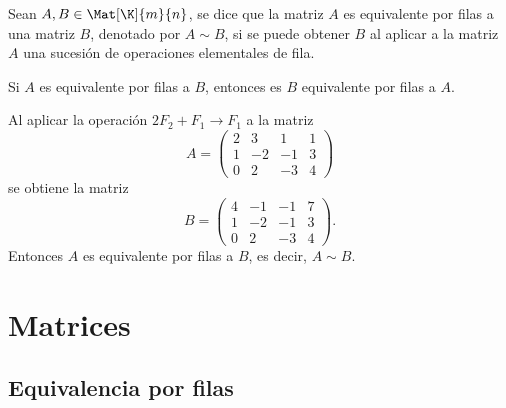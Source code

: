 \documentclass[compacto,10pt]{pubciencias-notas}
\begin{document}
\begin{defi}
    Sean $A,B\in \Mat[\K]{m}{n}$, se dice que la matriz $A$ es equivalente por filas a una matriz $B$, denotado por $A\sim B$, si se puede obtener $B$ al aplicar a la matriz $A$ una sucesión de operaciones elementales de fila.
\end{defi}

\begin{advertencia}
Si $A$ es equivalente por filas a $B$, entonces es $B$ equivalente por filas a $A$.
\end{advertencia}

\begin{ejem}\hspace{0pt} Al aplicar la operación $2F_2+F_1\rightarrow F_1$ a la matriz
\[
    A=\begin{pmatrix}
        2&3&1&1\\
        1&-2&-1&3\\
        0&2&-3&4
    \end{pmatrix}
\]
se obtiene la matriz
\[
    B=\begin{pmatrix}
        4&-1&-1&7\\
        1&-2&-1&3\\
        0&2&-3&4
    \end{pmatrix}.
\]
Entonces $A$ es equivalente por filas a $B$, es decir, $A\sim B$. 
\end{ejem}


\section{Matrices}
\setcounter{subsection}{3}
\subsection{Equivalencia por filas}
\end{document}
